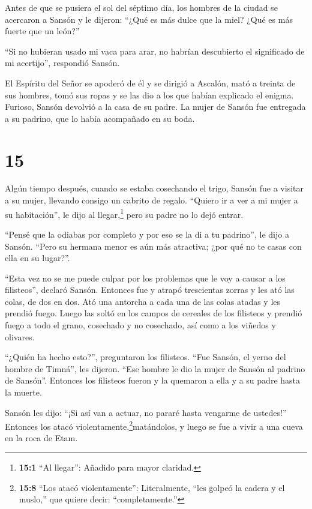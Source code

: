  Antes de que se pusiera el sol del séptimo día, los
hombres de la ciudad se acercaron a Sansón y le dijeron: ``¿Qué es más
dulce que la miel? ¿Qué es más fuerte que un león?''

``Si no hubieran usado mi vaca para arar, no habrían descubierto el
significado de mi acertijo'', respondió Sansón.

 El Espíritu del Señor se apoderó de él y se dirigió a
Ascalón, mató a treinta de sus hombres, tomó sus ropas y se las dio a
los que habían explicado el enigma. Furioso, Sansón devolvió a la casa
de su padre.  La mujer de Sansón fue entregada a su
padrino, que lo había acompañado en su boda.

\hypertarget{section-14}{%
\section{15}\label{section-14}}

 Algún tiempo después, cuando se estaba cosechando el trigo,
Sansón fue a visitar a su mujer, llevando consigo un cabrito de regalo.
``Quiero ir a ver a mi mujer a su habitación'', le dijo al
llegar,\footnote{\textbf{15:1} ``Al llegar'': Añadido para mayor
  claridad.} pero su padre no lo dejó entrar.

 ``Pensé que la odiabas por completo y por eso se la di a tu
padrino'', le dijo a Sansón. ``Pero su hermana menor es aún más
atractiva; ¿por qué no te casas con ella en su lugar?''.

 ``Esta vez no se me puede culpar por los problemas que le
voy a causar a los filisteos'', declaró Sansón.  Entonces
fue y atrapó trescientas zorras y les ató las colas, de dos en dos.
 Ató una antorcha a cada una de las colas atadas y les
prendió fuego. Luego las soltó en los campos de cereales de los
filisteos y prendió fuego a todo el grano, cosechado y no cosechado, así
como a los viñedos y olivares.

 ``¿Quién ha hecho esto?'', preguntaron los filisteos. ``Fue
Sansón, el yerno del hombre de Timná'', les dijeron. ``Ese hombre le dio
la mujer de Sansón al padrino de Sansón''. Entonces los filisteos fueron
y la quemaron a ella y a su padre hasta la muerte.

 Sansón les dijo: ``¡Si así van a actuar, no pararé hasta
vengarme de ustedes!''  Entonces los atacó
violentamente,\footnote{\textbf{15:8} ``Los atacó violentamente'':
  Literalmente, ``les golpeó la cadera y el muslo,'' que quiere decir:
  ``completamente.''}matándolos, y luego se fue a vivir a una cueva en
la roca de Etam.

